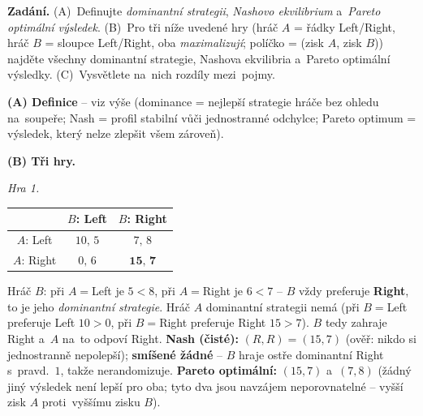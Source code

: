 \begin{priklad}
\par
\textbf{Zadání.} (A)~Definujte \emph{dominantní strategii}, \emph{Nashovo ekvilibrium} a~\emph{Pareto optimální výsledek}. (B)~Pro tři níže uvedené hry (hráč $A$ = řádky Left/Right, hráč $B$ = sloupce Left/Right, oba \emph{maximalizují}; políčko = (zisk $A$, zisk $B$)) najděte všechny dominantní strategie, Nashova ekvilibria a~Pareto optimální výsledky. (C)~Vysvětlete na~nich rozdíly mezi~pojmy.

\medskip
\textbf{(A) Definice} -- viz výše (dominance = nejlepší strategie hráče bez ohledu na~soupeře; Nash = profil stabilní vůči jednostranné odchylce; Pareto optimum = výsledek, který nelze zlepšit všem zároveň).

\medskip
\textbf{(B) Tři hry.}

\smallskip
\emph{Hra 1.}
\begin{center}\small\renewcommand{\arraystretch}{1.2}
\begin{tabular}{|c|c|c|}
\hline
 & $B$: Left & $B$: Right \\
\hline
$A$: Left  & $10,\,5$ & $7,\,8$ \\
\hline
$A$: Right & $0,\,6$ & $\mathbf{15,\,7}$ \\
\hline
\end{tabular}
\end{center}
Hráč $B$: při $A=$Left je $5<8$, při $A=$Right je $6<7$ -- $B$ vždy preferuje \textbf{Right}, to je jeho \emph{dominantní strategie}. Hráč $A$ dominantní strategii nemá (při $B=$Left preferuje Left $10>0$, při $B=$Right preferuje Right $15>7$). $B$ tedy zahraje Right a~$A$ na~to odpoví Right. \textbf{Nash (čisté):} $(R,R)=(15,7)$ (ověř: nikdo si jednostranně nepolepší); \textbf{smíšené žádné} -- $B$ hraje ostře dominantní Right s~pravd.\ $1$, takže nerandomizuje. \textbf{Pareto optimální:} $(15,7)$ a~$(7,8)$ (žádný jiný výsledek není lepší pro oba; tyto dva jsou navzájem neporovnatelné -- vyšší zisk $A$ proti~vyššímu zisku $B$).


\end{priklad}
